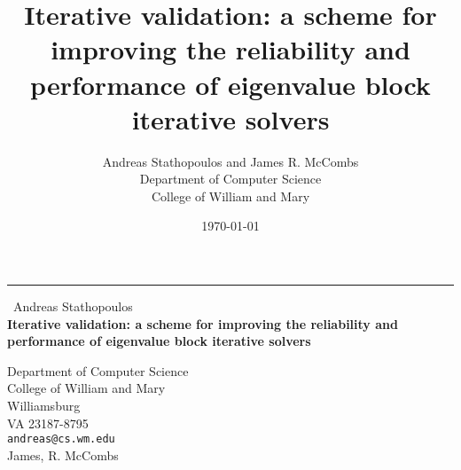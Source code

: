 \documentclass{report}
\begin{document}
\begin{center}
\rule{6in}{1pt} \
{\large Andreas Stathopoulos \\
{\bf Iterative validation: a scheme for improving the reliability and performance of eigenvalue block iterative solvers}}

Department of Computer Science  \\           College of William and Mary \\ Williamsburg \\ VA 23187-8795
\\
{\tt andreas@cs.wm.edu}\\
James, R. McCombs\end{center}

\evensidemargin=0.0in
\oddsidemargin=0.0in
\topmargin=-0.5in
\textwidth=6.5in
\textheight=9.0in

\title{Iterative validation: a scheme for improving the reliability
and performance of eigenvalue block iterative solvers}

\author{ Andreas Stathopoulos and James R. McCombs \\[.1in]
Department of Computer Science \\
College of William and Mary }
\date{\today}
\end{document}
